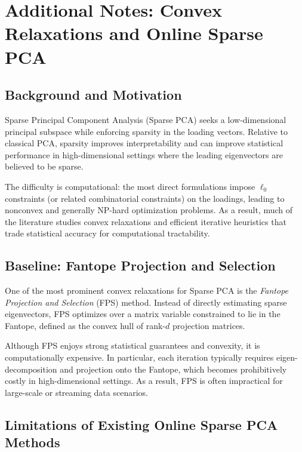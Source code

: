\documentclass[12pt]{article}
\begin{document}
\appendix

\section{Additional Notes: Convex Relaxations and Online Sparse PCA}

\subsection{Background and Motivation}

Sparse Principal Component Analysis (Sparse PCA) seeks a low-dimensional principal
subspace while enforcing sparsity in the loading vectors. Relative to classical
PCA, sparsity improves interpretability and can improve statistical performance in
high-dimensional settings where the leading eigenvectors are believed to be sparse.

The difficulty is computational: the most direct formulations impose $\ell_0$
constraints (or related combinatorial constraints) on the loadings, leading to
nonconvex and generally NP-hard optimization problems. As a result, much of the
literature studies convex relaxations and efficient iterative heuristics that trade
statistical accuracy for computational tractability.

\subsection{Baseline: Fantope Projection and Selection}

One of the most prominent convex relaxations for Sparse PCA is the
\emph{Fantope Projection and Selection} (FPS) method.
Instead of directly estimating sparse eigenvectors, FPS optimizes over a matrix
variable constrained to lie in the Fantope, defined as the convex hull of rank-$d$
projection matrices.

Although FPS enjoys strong statistical guarantees and convexity, it is
computationally expensive. In particular, each iteration typically requires
eigen-decomposition and projection onto the Fantope, which becomes prohibitively
costly in high-dimensional settings. As a result, FPS is often impractical for
large-scale or streaming data scenarios.

\subsection{Limitations of Existing Online Sparse PCA Methods}
\end{document}
